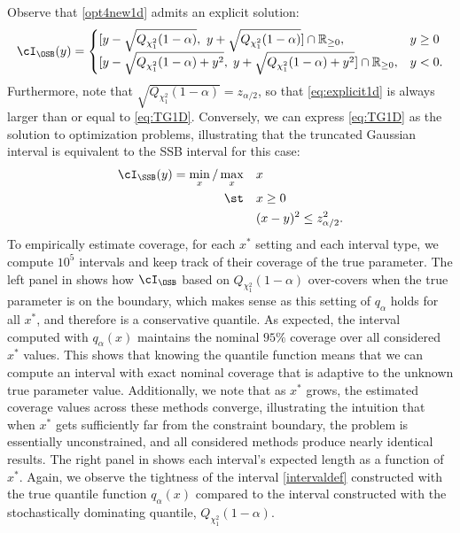 \documentclass[11pt]{article}
\numberwithin{equation}{section}
\numberwithin{figure}{section}
\begin{document}
Observe that \eqref{opt4new1d} admits an explicit solution:
\begin{align}\label{eq:explicit1d}
\cI_{\OSB}(y) = 
\begin{cases}
[y - \sqrt{Q_{\chi^2_1}(1 - \alpha)},\ y + \sqrt{Q_{\chi^2_1}(1 - \alpha)} ]  \cap \mathbb{R}_{\ge 0}, & y \geq 0 \\     
[y - \sqrt{Q_{\chi^2_1}(1 - \alpha) + y^2},\; y + \sqrt{Q_{\chi^2_1}(1 - \alpha) + y^2} ]  \cap \mathbb{R}_{\ge 0}, & y < 0.
\end{cases}
\end{align}
Furthermore, note that $\sqrt{Q_{\chi^2_1}(1 - \alpha)} = z_{\alpha/2}$, so that \eqref{eq:explicit1d} is always larger than or equal to \eqref{eq:TG1D}. 
Conversely, we can express \eqref{eq:TG1D} as the solution to optimization problems, illustrating that the truncated Gaussian interval is equivalent to the SSB interval for this case:
\begin{equation}\label{TGopt1D}
\begin{aligned}
\cI_{\SSB}(y) =  \min_{x}/\max_{x} \quad & x \\
\st \quad & x \geq 0\\
& (x-y)^2 \leq z_{\alpha/2}^2.
\end{aligned}
\end{equation}
To empirically estimate coverage, for each $x^*$ setting and each interval type, we compute $10^5$ intervals and keep track of their coverage of the true parameter. 
The left panel in  shows how $\cI_{\OSB}$ based on $Q_{\chi^2_1}(1 - \alpha)$ over-covers when the true parameter is on the boundary, which makes sense as this setting of $q_\alpha$ holds for all $x^*$, and therefore is a conservative quantile.
As expected, the interval computed with $q_\alpha(x)$ maintains the nominal $95\%$ coverage over all considered $x^*$ values. This shows that knowing the quantile function means that we can compute an interval with exact nominal coverage that is adaptive to the unknown true parameter value.
Additionally, we note that as $x^*$ grows, the estimated coverage values across these methods converge, illustrating the intuition that when $x^*$ gets sufficiently far from the constraint boundary, the problem is essentially unconstrained, and all considered methods produce nearly identical results. 
The right panel in  shows each interval's expected length as a function of $x^*$.
Again, we observe the tightness of the interval \eqref{intervaldef} constructed with the true quantile function $q_\alpha(x)$ compared to the interval constructed with the stochastically dominating quantile, $Q_{\chi^2_1}(1 - \alpha)$. 
\end{document}
